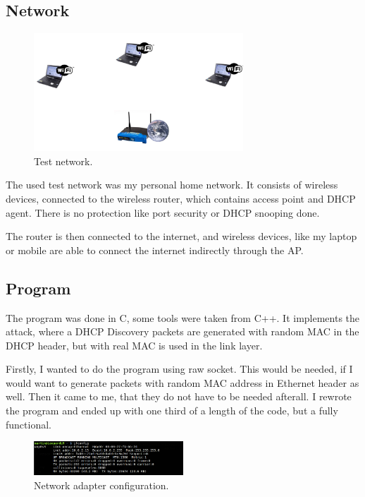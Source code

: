 \documentclass[10pt,a4paper,titlepage]{article}
\begin{document}
\subsection*{Network}
\begin{figure}[h!]
    \begin{center}
        \includegraphics[width=0.7\textwidth]{network.png}
        \caption{ Test network. \label{fig:network} \cite{laptop}}
    \end{center}
\end{figure}
The used test network was my personal home network. It consists of wireless
devices, connected to the wireless router, which contains access point and DHCP agent.
There is no protection like port security or DHCP snooping done.

The router is then connected to the internet, and wireless devices, like my laptop
or mobile are able to connect the internet indirectly through the AP.

\subsection*{Program}

The program was done in C, some tools were taken from C++. It implements the attack,
where a DHCP Discovery packets are generated with random MAC in the DHCP header,
but with real MAC is used in the link layer.

Firstly, I wanted to do the program using raw socket. This would be needed, if 
I would want to generate packets with random MAC address in Ethernet header as well.
Then it came to me, that they do not have to be needed afterall. I rewrote the
program and ended up with one third of a length of the code, but a fully functional.

\begin{figure}[h!]
    \begin{center}
        \includegraphics[width=0.5\textwidth]{ifconfig.png}
        \caption{ Network adapter configuration. \label{fig:ifconfig}}
    \end{center}
\end{figure}
\end{document}

